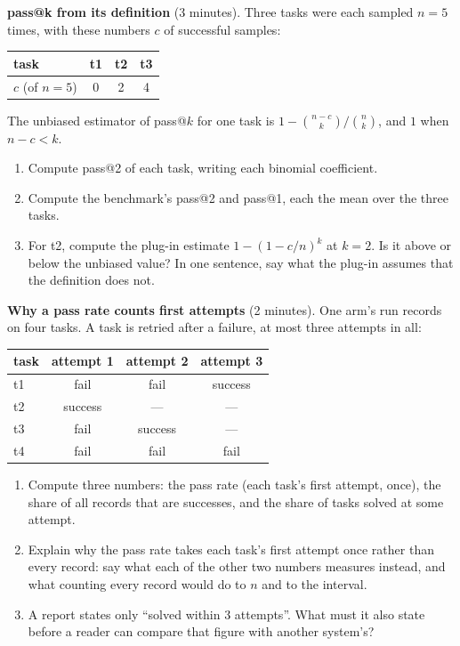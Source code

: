 \documentclass[11pt]{article}
\begin{document}
\begin{problem}\label{prob:B2}
\textbf{pass@k from its definition} (3 minutes). Three tasks were each sampled
$n = 5$ times, with these numbers $c$ of successful samples:
\begin{center}
\begin{tabular}{lccc}
task & t1 & t2 & t3 \\ \hline
$c$ (of $n = 5$) & 0 & 2 & 4
\end{tabular}
\end{center}
The unbiased estimator of pass@$k$ for one task is
$1 - \binom{n - c}{k} \big/ \binom{n}{k}$, and $1$ when $n - c < k$.
\begin{enumerate}
\item[(a)] Compute pass@2 of each task, writing each binomial coefficient.
\item[(b)] Compute the benchmark's pass@2 and pass@1, each the mean over the
  three tasks.
\item[(c)] For t2, compute the plug-in estimate $1 - (1 - c/n)^k$ at $k = 2$.
  Is it above or below the unbiased value? In one sentence, say what the
  plug-in assumes that the definition does not.
\end{enumerate}
\end{problem}

\begin{problem}[concept]\label{prob:B3}
\textbf{Why a pass rate counts first attempts} (2 minutes). One arm's run
records on four tasks. A task is retried after a failure, at most three
attempts in all:
\begin{center}
\begin{tabular}{lccc}
task & attempt 1 & attempt 2 & attempt 3 \\ \hline
t1 & fail & fail & success \\
t2 & success & --- & --- \\
t3 & fail & success & --- \\
t4 & fail & fail & fail
\end{tabular}
\end{center}
\begin{enumerate}
\item[(a)] Compute three numbers: the pass rate (each task's first attempt,
  once), the share of all records that are successes, and the share of tasks
  solved at some attempt.
\item[(b)] Explain why the pass rate takes each task's first attempt once
  rather than every record: say what each of the other two numbers measures
  instead, and what counting every record would do to $n$ and to the
  interval.
\item[(c)] A report states only ``solved within 3 attempts''. What must it
  also state before a reader can compare that figure with another system's?
\end{enumerate}
\end{problem}
\end{document}
